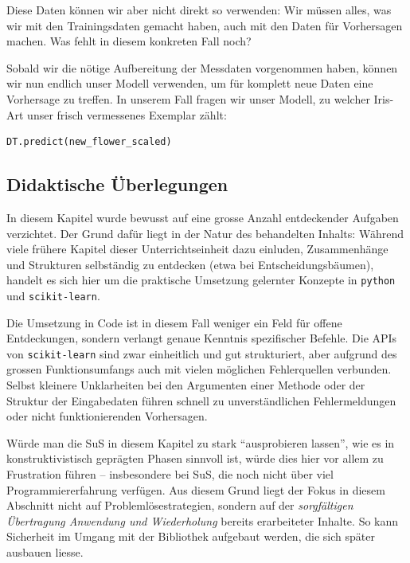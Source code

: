 \begin{lpu}
\begin{aufgabe}{3}
Diese Daten können wir aber nicht direkt so verwenden: Wir müssen alles, was wir mit den Trainingsdaten gemacht haben, auch mit den Daten für Vorhersagen machen. Was fehlt in diesem konkreten Fall noch?
\end{aufgabe}

Sobald wir die nötige Aufbereitung der Messdaten vorgenommen haben, können wir nun endlich unser Modell verwenden, um für komplett neue Daten eine Vorhersage zu treffen. In unserem Fall fragen wir unser Modell, zu welcher Iris-Art unser frisch vermessenes Exemplar zählt:

\begin{lstlisting}[language=Python]
DT.predict(new_flower_scaled)
\end{lstlisting}
\end{lpu}



\subsection*{Didaktische Überlegungen}

In diesem Kapitel wurde bewusst auf eine grosse Anzahl entdeckender Aufgaben verzichtet. Der Grund dafür liegt in der Natur des behandelten Inhalts: Während viele frühere Kapitel dieser Unterrichtseinheit dazu einluden, Zusammenhänge und Strukturen selbständig zu entdecken (etwa bei Entscheidungsbäumen), handelt es sich hier um die praktische Umsetzung gelernter Konzepte in \texttt{python} und \texttt{scikit-learn}.

Die Umsetzung in Code ist in diesem Fall weniger ein Feld für offene Entdeckungen, sondern verlangt genaue Kenntnis spezifischer Befehle. Die APIs von \texttt{scikit-learn} sind zwar einheitlich und gut strukturiert, aber aufgrund des grossen Funktionsumfangs auch mit vielen möglichen Fehlerquellen verbunden. Selbst kleinere Unklarheiten bei den Argumenten einer Methode oder der Struktur der Eingabedaten führen schnell zu unverständlichen Fehlermeldungen oder nicht funktionierenden Vorhersagen.

Würde man die SuS in diesem Kapitel zu stark ``ausprobieren lassen'', wie es in konstruktivistisch geprägten Phasen sinnvoll ist, würde dies hier vor allem zu Frustration führen – insbesondere bei SuS, die noch nicht über viel Programmiererfahrung verfügen. Aus diesem Grund liegt der Fokus in diesem Abschnitt nicht auf Problemlösestrategien, sondern auf der \emph{sorgfältigen Übertragung Anwendung und Wiederholung} bereits erarbeiteter Inhalte. So kann Sicherheit im Umgang mit der Bibliothek aufgebaut werden, die sich später ausbauen liesse.


